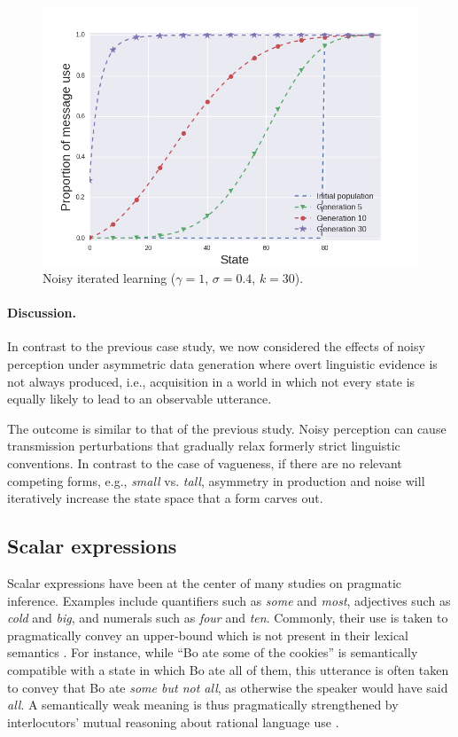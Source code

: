 \documentclass[10pt,a4paper]{article}
\newcommand{\postparameter}{\ensuremath{\gamma}}
\begin{document}
\begin{figure}[ht]
\centering
    \includegraphics[scale=0.4]{../code/plots/deflation-sigma04.png}
  \caption{Noisy iterated learning ($\postparameter=1$, $\sigma = 0.4$, $k = 30$).}
  \label{fig:defl}
\end{figure}

\paragraph{Discussion.} In contrast to the previous case study, we now considered the effects
of noisy perception under asymmetric data generation where overt linguistic evidence is not
always produced, i.e., acquisition in a world in which not every state is equally likely to lead to an observable
utterance. %

The outcome is similar to that of the previous study. Noisy perception can cause transmission
perturbations that gradually relax formerly strict linguistic conventions. In contrast to the
case of vagueness, if there are no relevant competing forms, e.g., {\em small} vs. {\em tall},
asymmetry in production and noise will iteratively increase the state space that a form carves
out.

\subsection{Scalar expressions}
Scalar expressions have been at the center of many studies on pragmatic inference. Examples
include quantifiers such as {\em some} and {\em most}, adjectives such as {\em cold} and {\em
  big}, and numerals such as {\em four} and {\em ten}. Commonly, their use is taken to
pragmatically convey an upper-bound which is not present in their lexical semantics
\citep{horn:1972,gazdar:1979}. For instance, while ``Bo ate some of the cookies'' is
semantically compatible with a state in which Bo ate all of them, this utterance is often taken to convey 
that Bo ate {\em some but not all}, as otherwise the speaker would have said {\em all}. A
semantically weak meaning is thus pragmatically strengthened by interlocutors' mutual reasoning
about rational language use \citep{grice:1975}. 
\end{document}
